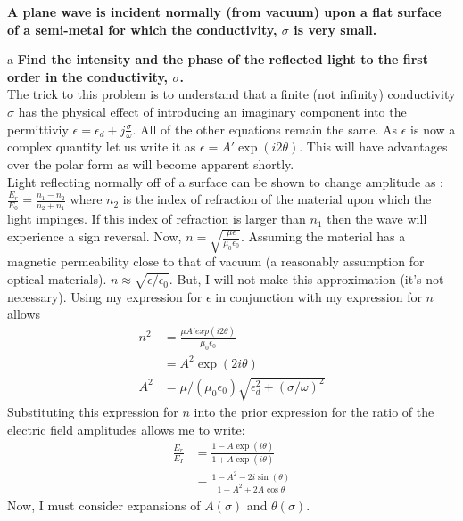 \begin{homeworkProblem}
\textbf{A plane wave is incident normally (from vacuum) upon a flat surface of a semi-metal for
which the conductivity, $\sigma$ is very small.}

\begin{homeworkSection}{a}
\textbf{Find the intensity and the phase of the reflected light to the first order in the conductivity, $\sigma$.
}
\\

The trick to this problem is to understand that a finite (not infinity) conductivity $\sigma$ has the physical effect of introducing an imaginary component into the permittiviy $\epsilon = \epsilon_{d} + j\frac{\sigma}{\omega}$. All of the other equations remain the same. As $\epsilon$ is now a complex quantity let us write it as $\epsilon = A'\exp(i2\theta)$. This will have advantages over the polar form as will become apparent shortly.
\\

Light reflecting normally off of a surface can be shown to change amplitude as : $\frac{E_r}{E_0} = \frac{n_1-n_2}{n_2+n_1}$ where $n_2$ is the index of refraction of the material upon which the light impinges. If this index of refraction is larger than $n_1$ then the wave will experience a sign reversal. Now, $n = \sqrt{\frac{\mu \epsilon}{\mu_0 \epsilon_0}}$. Assuming the material has a magnetic permeability close to that of vacuum (a reasonably assumption for optical materials). $n \approx \sqrt{\epsilon/\epsilon_0}$. But, I will not make this approximation (it's not necessary). Using my expression for $\epsilon$ in conjunction with my expression for $n$ allows 
\begin{align*}
n^2 &= \frac{\mu A' exp(i2\theta)}{\mu_0\epsilon_0} \\ &= A^2\exp(2i\theta) \\
A^2 &= \mu/(\mu_0 \epsilon_0)\sqrt{\epsilon_{d}^2+(\sigma/\omega)^2}
\end{align*}
Substituting this expression for $n$ into the prior expression for the ratio of the electric field amplitudes allows me to write: 
\begin{align*}
\frac{E_r}{E_I} &= \frac{1-A\exp(i\theta)}{1+A\exp(i\theta)} \\
&= \frac{1-A^2-2i\sin(\theta)}{1+A^2+2A\cos\theta}
\end{align*}
Now, I must consider expansions of $A(\sigma)$ and $\theta(\sigma)$.
\\


\end{homeworkSection}
\end{homeworkProblem}
